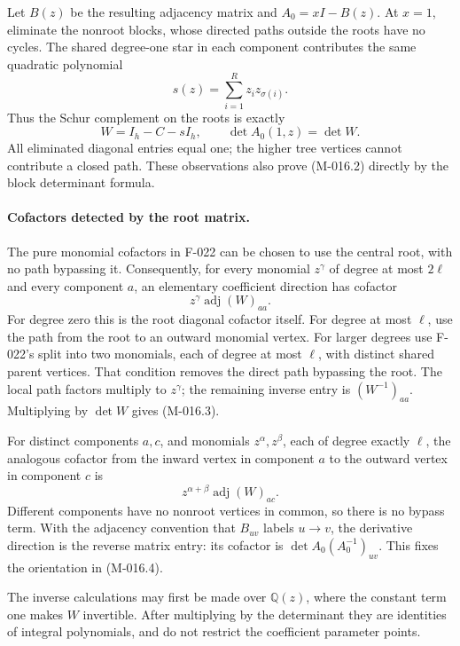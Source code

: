 Let \(B(z)\) be the resulting adjacency matrix and
\(A_0=xI-B(z)\). At \(x=1\), eliminate the nonroot
blocks, whose directed paths outside the roots have no cycles.
The shared degree-one star in each component contributes
the same quadratic polynomial
\[
                 s(z)=\sum_{i=1}^R z_i z_{\sigma(i)}.
\]
Thus the Schur complement on the roots is exactly
\[
                         W=I_h-C-sI_h,
                 \qquad \det A_0(1,z)=\det W.           \tag{M-016.2}
\]
All eliminated diagonal entries equal one; the higher tree
vertices cannot contribute a closed path. These observations
also prove (M-016.2) directly by the block determinant formula.

\paragraph{Cofactors detected by the root matrix.}
The pure monomial cofactors in F-022 can be chosen to use
the central root, with no path bypassing it. Consequently,
for every monomial \(z^\gamma\) of degree at most \(2\ell\)
and every component \(a\), an elementary coefficient
direction has cofactor
\[
                         z^\gamma\operatorname{adj}(W)_{aa}.
                                                               \tag{M-016.3}
\]
For degree zero this is the root diagonal cofactor itself.
For degree at most \(\ell\), use the path from the root
to an outward monomial vertex. For larger degrees use
F-022's split into two monomials, each of degree at most
\(\ell\), with distinct shared parent vertices. That
condition removes the direct path bypassing the root.
The local path factors multiply to \(z^\gamma\);
the remaining inverse entry is \((W^{-1})_{aa}\).
Multiplying by \(\det W\) gives (M-016.3).

For distinct components \(a,c\), and monomials
\(z^\alpha,z^\beta\), each of degree exactly \(\ell\),
the analogous cofactor from the inward vertex in component
\(a\) to the outward vertex in component \(c\) is
\[
                     z^{\alpha+\beta}\operatorname{adj}(W)_{ac}.
                                                               \tag{M-016.4}
\]
Different components have no nonroot vertices in common,
so there is no bypass term. With the adjacency convention
that \(B_{uv}\) labels \(u\to v\), the derivative direction
is the reverse matrix entry: its cofactor is
\(\det A_0(A_0^{-1})_{uv}\). This fixes the orientation
in (M-016.4).

The inverse calculations may first be made over
\(\mathbb Q(z)\), where the constant term one makes
\(W\) invertible. After multiplying by the determinant
they are identities of integral polynomials, and do not
restrict the coefficient parameter points.

